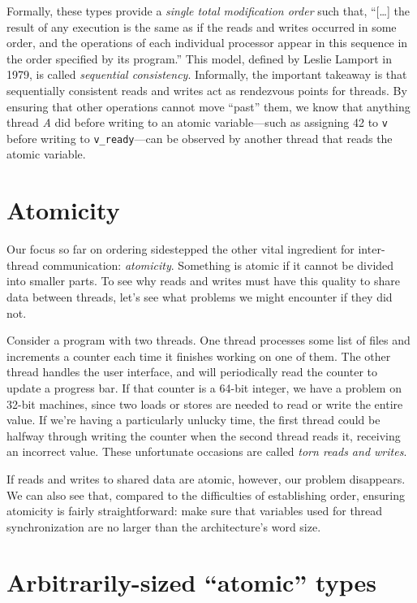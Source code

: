 \documentclass[fontsize=10pt, numbers=endperiod]{scrartcl}
\newcommand{\monobox}[1]{\mbox{\texttt{#1}}}
\newcommand{\introduce}[1]{\textit{#1}}
\begin{document}
\begin{multicols*}{2}
Formally, these types provide a \textit{single total modification order}
such that,
``[\ldots] the result of any execution is the same as if the reads and writes
occurred in some order, and the operations of each individual
processor appear in this sequence in the order specified by its program.''
This model, defined by Leslie Lamport in 1979,
is called \introduce{sequential consistency}.
Informally, the important takeaway is that sequentially consistent reads
and writes act as rendezvous points for threads.
By ensuring that other operations cannot move ``past'' them,
we know that anything thread \textit{A} did before writing to an atomic
variable---such as assigning 42 to \texttt{v} before writing to
\monobox{v\_ready}---can be observed by another thread that reads the
atomic variable.

\section{Atomicity}
\label{atomicity}

Our focus so far on ordering sidestepped the other vital ingredient for
inter-thread communication: \introduce{atomicity}.
Something is atomic if it cannot be divided into smaller parts.
To see why reads and writes must have this quality to share data between threads,
let's see what problems we might encounter if they did not.

Consider a program with two threads.
One thread processes some list of files
and increments a counter each time it finishes working on one of them.
The other thread handles the user interface, and will periodically read
the counter to update a progress bar.
If that counter is a 64-bit integer, we have a problem on 32-bit machines,
since two loads or stores are needed to read or write the entire value.
If we're having a particularly unlucky time,
the first thread could be halfway through writing the counter
when the second thread reads it, receiving an incorrect value.
These unfortunate occasions are called \introduce{torn reads and writes}.

If reads and writes to shared data are atomic, however,
our problem disappears.
We can also see that, compared to the difficulties of establishing order,
ensuring atomicity is fairly straightforward:
make sure that variables used for thread synchronization are no larger than
the architecture's word size.

\section{Arbitrarily-sized “atomic” types}


\end{multicols*}
\end{document}

